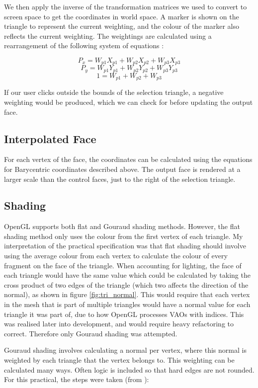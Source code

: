 \documentclass[12pt]{article}
\begin{document}
We then apply the inverse of the transformation matrices we used to convert to screen space to get the coordinates in world space.
A marker is shown on the triangle to represent the current weighting, and the colour of the marker also reflects the current weighting.
The weightings are calculated using a rearrangement of the following system of equations \cite{barycentric}:

$$
P_x = W_{p1}X_{p1} + W_{p2}X_{p2} + W_{p3}X_{p3} 
$$
$$
P_y = W_{p1}Y_{p1} + W_{p2}Y_{p2} + W_{p3}Y_{p3}
$$
$$
1 = W_{p1} + W_{p2} + W_{p3}
$$

If our user clicks outside the bounds of the selection triangle, a negative weighting would be produced, which we can check for before updating the output face.

\subsection{Interpolated Face}

For each vertex of the face, the coordinates can be calculated using the equations for Barycentric coordinates described above.
The output face is rendered at a larger scale than the control faces, just to the right of the selection triangle.

\subsection{Shading}

OpenGL supports both flat and Gouraud shading methods. 
However, the flat shading method only uses the colour from the first vertex of each triangle.
My interpretation of the practical specification was that flat shading should involve using the average colour from each vertex to calculate the colour of every fragment on the face of the triangle.
When accounting for lighting, the face of each triangle would have the same value which could be calculated by taking the cross product of two edges of the triangle (which two affects the direction of the normal), as shown in figure \ref{fig:tri_normal}. 
This would require that each vertex in the mesh that is part of multiple triangles would have a normal value for each triangle it was part of, due to how OpenGL processes VAOs with indices.
This was realised later into development, and would require heavy refactoring to correct. 
Therefore only Gouraud shading was attempted.

Gouraud shading involves calculating a normal per vertex, where this normal is weighted by each triangle that the vertex belongs to.
This weighting can be calculated many ways.
Often logic is included so that hard edges are not rounded.
For this practical, the steps were taken (from \cite{gouraud}):
\end{document}

